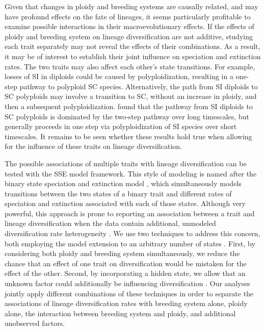 Given that changes in ploidy and breeding systems are causally related, and may have profound effects on the fate of lineages, it seems particularly profitable to examine possible interactions in their macroevolutionary effects.
If the effects of ploidy and breeding system on lineage diversification are not additive, studying each trait separately may not reveal the effects of their combinations.
As a result, it may be of interest to establish their joint influence on speciation and extinction rates.
The two traits may also affect each other's state transitions.
For example, losses of SI in diploids could be caused by polyploidization, resulting in a one-step pathway to polyploid SC species. 
Alternatively, the path from SI diploids to SC polyploids may involve a transition to SC, without an increase in ploidy, and then a subsequent polyploidization. 
\citet{robertson_2011} found that the pathway from SI diploids to SC polyploids is dominated by the two-step pathway over long timescales, but generally proceeds in one step via polyploidization of SI species over short timescales.
It remains to be seen whether these results hold true when allowing for the influence of these traits on lineage diversification.

The possible associations of multiple traits with lineage diversification can be tested with the SSE model framework.
This style of modeling is named after the binary state speciation and extinction model \citep[BiSSE; ][]{maddison_2007}, which simultaneously models transitions between the two states of a binary trait and different rates of speciation and extinction associated with each of those states.
Although very powerful, this approach is prone to reporting an association between a trait and lineage diversification when the data contain additional, unmodeled diversification rate heterogeneity \citep{rabosky_2015}.
We use two techniques to address this concern, both employing the model extension to an arbitrary number of states \citep[MuSSE][]{fitzjohn_2012}.
First, by considering both ploidy and breeding system simultaneously, we reduce the chance that an effect of one trait on diversification would be mistaken for the effect of the other.
Second, by incorporating a hidden state, we allow that an unknown factor could additionally be influencing diversification \citep[HiSSE][]{beaulieu_2016}.
Our analyses jointly apply different combinations of these techniques in order to separate the associations of lineage diversification rates with breeding system alone, ploidy alone, the interaction between breeding system and ploidy, and additional unobserved factors.

